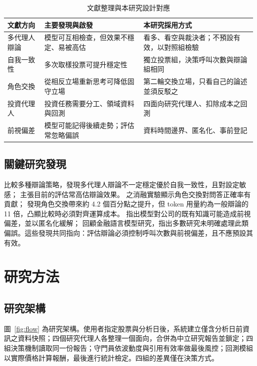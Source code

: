 \documentclass[12pt,a4paper]{article}
\begin{document}
\begin{CJK}{UTF8}{bkai}
\begin{table}[H]
\centering\small
\caption{文獻整理與本研究設計對應}
\label{tab:litmap}
\begin{tabularx}{\textwidth}{@{}l Y Y@{}}
\toprule
文獻方向 & 主要發現與啟發 & 本研究採用方式 \\
\midrule
多代理人辯論 & 模型可互相檢查，但效果不穩定、易被高估 & 看多、看空與裁決者；不預設有效，以對照組檢驗 \\
自我一致性 & 多次取樣投票可提升穩定性 & 獨立投票組，決策呼叫次數與辯論組相同 \\
角色交換 & 從相反立場重新思考可降低固守立場 & 第二輪交換立場，只看自己的論述並須反駁之 \\
投資代理人 & 投資任務需要分工、領域資料與回測 & 四面向研究代理人、扣除成本之回測 \\
前視偏差 & 模型可能記得後續走勢；評估常忽略偏誤 & 資料時間邊界、匿名化、事前登記 \\
\bottomrule
\end{tabularx}
\end{table}

\subsection{關鍵研究發現}

\citet{smit2023mad} 比較多種辯論策略，發現多代理人辯論不一定穩定優於自我一致性，且對設定敏感；\citet{zhang2025stop} 主張目前的評估常高估辯論效果。\citet{liu2025roleswitch} 之消融實驗顯示角色交換對問答正確率有貢獻；\citet{chowdhury2026proclaim} 發現角色交換帶來約 4.2 個百分點之提升，但 token 用量約為一般辯論的 11 倍，凸顯比較時必須對齊運算成本。\citet{glasserman2023lookahead} 指出模型對公司的既有知識可能造成前視偏差，並以匿名化緩解；\citet{kong2026bias} 回顧金融語言模型研究，指出多數研究未明確處理此類偏誤。這些發現共同指向：評估辯論必須控制呼叫次數與前視偏差，且不應預設其有效。

\section{研究方法}

\subsection{研究架構}

圖~\ref{fig:flow} 為研究架構。使用者指定股票與分析日後，系統建立僅含分析日前資訊之資料快照；四個研究代理人各整理一個面向，合併為中立研究報告並鎖定；四組決策機制讀取同一份報告；守門員依波動度與引用有效率做最後風控；回測模組以實際價格計算報酬，最後進行統計檢定。四組的差異僅在決策方式。


\end{CJK}
\end{document}
